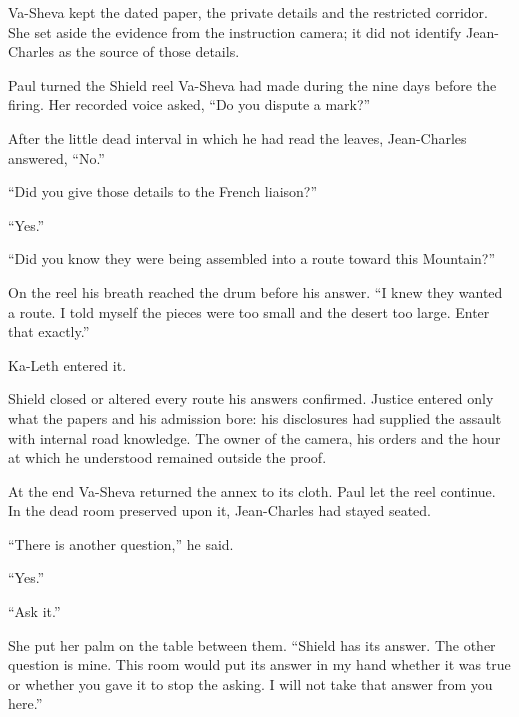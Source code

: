 Va-Sheva kept the dated paper, the private details and the restricted corridor. She set aside the evidence from the instruction camera; it did not identify Jean-Charles as the source of those details.\par

Paul turned the Shield reel Va-Sheva had made during the nine days before the firing. Her recorded voice asked, ``Do you dispute a mark?''\par

After the little dead interval in which he had read the leaves, Jean-Charles answered, ``No.''\par

``Did you give those details to the French liaison?''\par

``Yes.''\par

``Did you know they were being assembled into a route toward this Mountain?''\par

On the reel his breath reached the drum before his answer. ``I knew they wanted a route. I told myself the pieces were too small and the desert too large. Enter that exactly.''\par

Ka-Leth entered it.\par

Shield closed or altered every route his answers confirmed. Justice entered only what the papers and his admission bore: his disclosures had supplied the assault with internal road knowledge. The owner of the camera, his orders and the hour at which he understood remained outside the proof.\par

At the end Va-Sheva returned the annex to its cloth. Paul let the reel continue. In the dead room preserved upon it, Jean-Charles had stayed seated.\par

``There is another question,'' he said.\par

``Yes.''\par

``Ask it.''\par

She put her palm on the table between them. ``Shield has its answer. The other question is mine. This room would put its answer in my hand whether it was true or whether you gave it to stop the asking. I will not take that answer from you here.''\par

